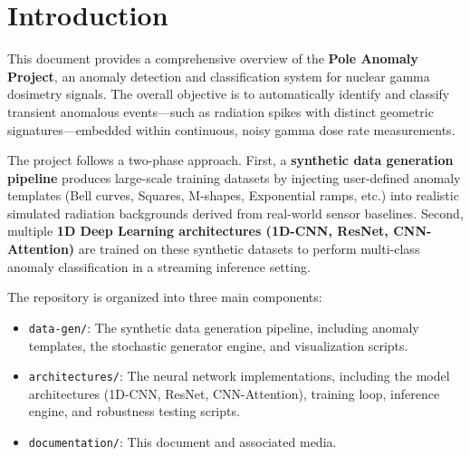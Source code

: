 \section{Introduction}
This document provides a comprehensive overview of the \textbf{Pole Anomaly Project}, an anomaly detection and classification system for nuclear gamma dosimetry signals. The overall objective is to automatically identify and classify transient anomalous events---such as radiation spikes with distinct geometric signatures---embedded within continuous, noisy gamma dose rate measurements.

The project follows a two-phase approach. First, a \textbf{synthetic data generation pipeline} produces large-scale training datasets by injecting user-defined anomaly templates (Bell curves, Squares, M-shapes, Exponential ramps, etc.) into realistic simulated radiation backgrounds derived from real-world sensor baselines. Second, multiple \textbf{1D Deep Learning architectures (1D-CNN, ResNet, CNN-Attention)} are trained on these synthetic datasets to perform multi-class anomaly classification in a streaming inference setting.

The repository is organized into three main components:
\begin{itemize}
    \item \texttt{data-gen/}: The synthetic data generation pipeline, including anomaly templates, the stochastic generator engine, and visualization scripts.
    \item \texttt{architectures/}: The neural network implementations, including the model architectures (1D-CNN, ResNet, CNN-Attention), training loop, inference engine, and robustness testing scripts.
    \item \texttt{documentation/}: This document and associated media.
\end{itemize}
